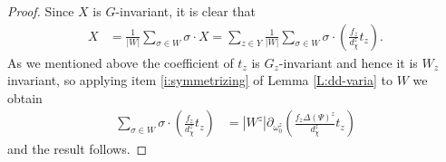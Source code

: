 \documentclass[11pt,fleqn]{article}
\begin{document}
\begin{Proposition*}
\begin{proof}
Since $X$ is $G$-invariant, it is clear that
\begin{align*}
X 
	&= \frac{1}{|W|} \sum_{\sigma \in W} \sigma \cdot X
	=\sum_{z \in Y} \frac{1}{|W|}\sum_{\sigma \in W} \sigma \cdot 
		\left( \frac{f_z}{d_\chi^z} t_z\right).
\end{align*}
As we mentioned above the coefficient of $t_z$ is $G_z$-invariant and hence it 
is $W_z$ invariant, so applying item \ref{i:symmetrizing} of Lemma 
\ref{L:dd-varia} to $W$ we obtain
\begin{align*}
\sum_{\sigma \in W} \sigma \cdot
		\left(\frac{f_z}{d_\chi^z} t_z \right)
		&= |W^z| \partial_{\omega_0^{z}}\left(
			\frac{f_z \Delta(\Psi)^z}{d_\chi^z} t_z 
		\right)
\end{align*}
and the result follows.
\end{proof}
\end{Proposition*}
\end{document}
